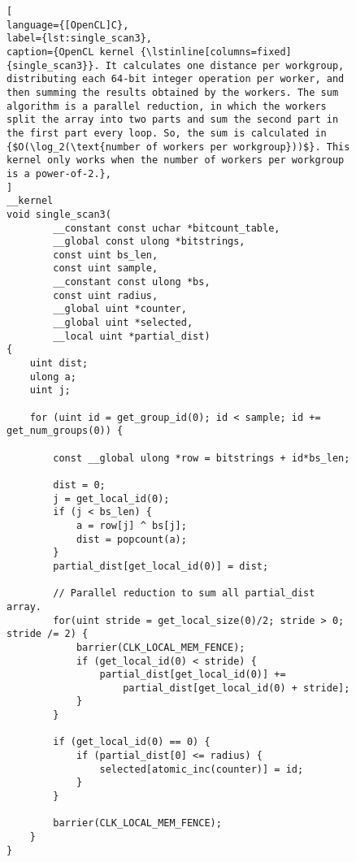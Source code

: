\begin{figure}[!p]
\begin{lstlisting}[
language={[OpenCL]C},
label={lst:single_scan3},
caption={OpenCL kernel {\lstinline[columns=fixed]{single_scan3}}. It calculates one distance per workgroup, distributing each 64-bit integer operation per worker, and then summing the results obtained by the workers. The sum algorithm is a parallel reduction, in which the workers split the array into two parts and sum the second part in the first part every loop. So, the sum is calculated in {$O(\log_2(\text{number of workers per workgroup}))$}. This kernel only works when the number of workers per workgroup is a power-of-2.},
]
__kernel
void single_scan3(
        __constant const uchar *bitcount_table,
        __global const ulong *bitstrings,
        const uint bs_len,
        const uint sample,
        __constant const ulong *bs,
        const uint radius,
        __global uint *counter,
        __global uint *selected,
        __local uint *partial_dist)
{
    uint dist;
    ulong a;
    uint j;

    for (uint id = get_group_id(0); id < sample; id += get_num_groups(0)) {

        const __global ulong *row = bitstrings + id*bs_len;

        dist = 0;
        j = get_local_id(0);
        if (j < bs_len) {
            a = row[j] ^ bs[j];
            dist = popcount(a);
        }
        partial_dist[get_local_id(0)] = dist;

        // Parallel reduction to sum all partial_dist array.
        for(uint stride = get_local_size(0)/2; stride > 0; stride /= 2) {
            barrier(CLK_LOCAL_MEM_FENCE);
            if (get_local_id(0) < stride) {
                partial_dist[get_local_id(0)] +=
                    partial_dist[get_local_id(0) + stride];
            }
        }

        if (get_local_id(0) == 0) {
            if (partial_dist[0] <= radius) {
                selected[atomic_inc(counter)] = id;
            }
        }

        barrier(CLK_LOCAL_MEM_FENCE);
    }
}
\end{lstlisting}
\end{figure}

